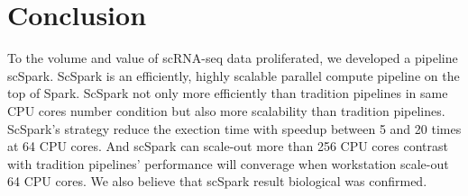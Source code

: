 \documentclass[conference]{IEEEtran}
\begin{document}
\section{Conclusion}

To the volume and value of scRNA-seq data proliferated, we developed a pipeline scSpark.
ScSpark is an efficiently, highly scalable parallel compute pipeline on the top of Spark.
ScSpark not only more efficiently than tradition pipelines in same CPU cores number condition but also more scalability than tradition pipelines.
ScSpark's strategy reduce the exection time with speedup between 5 and 20 times at 64 CPU cores.
And scSpark can scale-out more than 256 CPU cores contrast with tradition pipelines' performance will converage when workstation scale-out 64 CPU cores.
We also believe that scSpark result biological was confirmed. 



\end{document}
